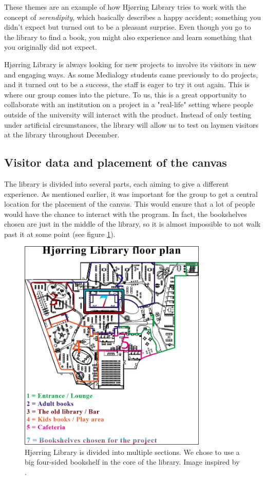 These themes are an example of how Hj{\o}rring Library tries to work with the concept of \textit{serendipity}, which basically describes a happy accident; something you didn't expect but turned out to be a pleasant surprise. Even though you go to the library to find a book, you might also experience and learn something that you originally did not expect.

Hj{\o}rring Library is always looking for new projects to involve its visitors in new and engaging ways. As some Medialogy students came previously to do projects, and it turned out to be a success, the staff is eager to try it out again. This is where our group comes into the picture. To us, this is a great opportunity to collaborate with an institution on a project in a "real-life" setting where people outside of the university will interact with the product. Instead of only testing under artificial circumstances, the library will allow us to test on laymen visitors at the library throughout December.

\subsection{Visitor data and placement of the canvas}
The library is divided into several parts, each aiming to give a different experience. As mentioned earlier, it was important for the group to get a central location for the placement of the canvas. This would ensure that a lot of people would have the chance to interact with the program. In fact, the bookshelves chosen are just in the middle of the library, so it is almost impossible to not walk past it at some point (see figure \ref{fig:library_floorplans}).

\begin{figure}[htbp]
\centering
\includegraphics[width=0.80\textwidth]{Pictures/HjoerringLibrary/hjoerring_library_floorplans.png}
\caption{Hj{\o}rring Library is divided into multiple sections. We chose to use a big four-sided bookshelf in the core of the library. Image inspired by \citep{hjoerring_study}.}
\label{fig:library_floorplans}
\end{figure}

